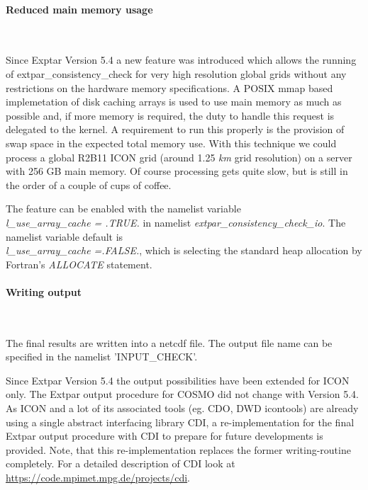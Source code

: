 \documentclass[a4paper,10pt,DIV14,BCOR1cm,titlepage,twoside]{scrartcl}
\begin{document}
\paragraph{Reduced main memory usage}\ \par\medskip\noindent

\noindent Since Exptar Version 5.4 a new feature was introduced 
which allows the running of extpar\_consistency\_check for very 
high resolution global grids without any restrictions on the hardware memory specifications.
A POSIX mmap based implemetation of disk caching arrays is
used to use main memory as much as possible and, if more memory
is required, the duty to handle this request is delegated to the
kernel. A requirement to run this properly is the provision of
swap space in the expected total memory use. With this technique
we could process a global R2B11 ICON grid (around 1.25 \textit{km} grid
resolution) on a server with 256 GB main memory. Of course
processing gets quite slow, but is still in the order of a couple
of cups of coffee. 

\noindent The feature can be enabled with the namelist
variable \\ \textit{l\_use\_array\_cache = .TRUE.} in namelist
\textit{extpar\_consistency\_check\_io}. The namelist variable default is \\
\textit{l\_use\_array\_cache =.FALSE.}, which is selecting the standard heap allocation by
Fortran's \textit{ALLOCATE} statement.

\paragraph{Writing output}\ \par\medskip\noindent
The final results are written into a netcdf file. The output file name can be specified in the namelist 'INPUT\_CHECK'.\par\medskip\noindent
Since Extpar Version 5.4 the output possibilities have been extended for ICON only. The Extpar output procedure for COSMO did not change with Version 5.4. 
As ICON and a lot of its associated tools (eg. CDO, DWD icontools)
are already using a single abstract interfacing library CDI, a
re-implementation for the final Extpar output procedure with CDI to
prepare for future developments is provided. Note, that this re-implementation replaces the former writing-routine completely. For a detailed description of
CDI look at \\
\url{https://code.mpimet.mpg.de/projects/cdi}. 
\end{document}
